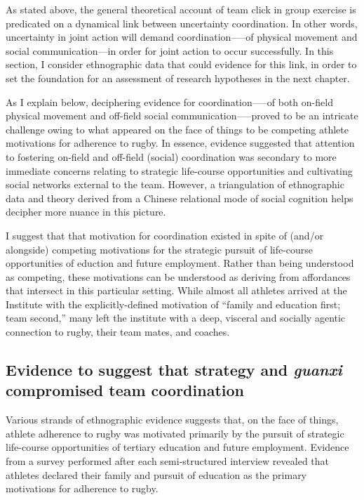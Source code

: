 \begin{CJK}{UTF8}{gbsn}
As stated above, the general theoretical account of team click in group exercise is predicated on a dynamical link between uncertainty coordination.  In other words, uncertainty in joint action will demand coordination—--of physical movement and social communication---in order for joint action to occur successfully.  In this section, I consider ethnographic data that could evidence for this link, in order to set the foundation for an assessment of research hypotheses in the next chapter.

As I explain below, deciphering evidence for coordination—--of both on-field physical movement and off-field social communication—--proved to be an intricate challenge owing to what appeared on the face of things to be competing athlete motivations for adherence to rugby.   In essence, evidence suggested that attention to fostering on-field and off-field (social) coordination was secondary to more immediate concerns relating to strategic life-course opportunities and cultivating social networks external to the team.  However, a triangulation of ethnographic data and theory derived from a Chinese relational mode of social cognition helps decipher more nuance in this picture.

I suggest that that motivation for coordination existed in spite of (and/or alongside) competing motivations for the strategic pursuit of life-course opportunities of eduction and future employment.  Rather than being understood as competing, these motivations can be understood as deriving from affordances that intersect in this particular setting.  While almost all athletes arrived at the Institute with the explicitly-defined motivation of ``family and education first; team second,'' many left the institute with a deep, visceral and socially agentic connection to rugby, their team mates, and coaches.


\subsection{Evidence to suggest that strategy and \textit{guanxi} compromised team coordination}

Various strands of ethnographic evidence suggests that, on the face of things, athlete adherence to rugby was motivated primarily by the pursuit of strategic life-course opportunities of tertiary education and future employment.  Evidence from a survey performed after each semi-structured interview revealed that athletes declared their family and pursuit of education as the primary motivations for adherence to rugby.


\end{CJK}
